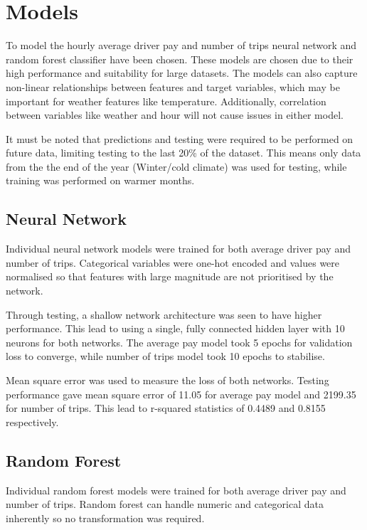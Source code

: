 \documentclass[11pt]{article}
\begin{document}
\section{Models}

To model the hourly average driver pay and number of trips neural network and random forest classifier have been chosen. These models are chosen due to their high performance and suitability for large datasets. The models can also capture non-linear relationships between features and target variables, which may be important for weather features like temperature. Additionally, correlation between variables like weather and hour will not cause issues in either model.

It must be noted that predictions and testing were required to be performed on future data, limiting testing to the last 20\% of the dataset. This means only data from the the end of the year (Winter/cold climate) was used for testing, while training was performed on warmer months.

\subsection{Neural Network}

Individual neural network models were trained for both average driver pay and number of trips. Categorical variables were one-hot encoded and values were normalised so that features with large magnitude are not prioritised by the network.

Through testing, a shallow network architecture was seen to have higher performance. This lead to using a single, fully connected hidden layer with 10 neurons for both networks. The average pay model took 5 epochs for validation loss to converge, while number of trips model took 10 epochs to stabilise. 

Mean square error was used to measure the loss of both networks. Testing performance gave mean square error of 11.05 for average pay model and 2199.35 for number of trips. This lead to r-squared statistics of 0.4489 and 0.8155 respectively.

\subsection{Random Forest}

Individual random forest models were trained for both average driver pay and number of trips. Random forest can handle numeric and categorical data inherently so no transformation was required. 
\end{document}
